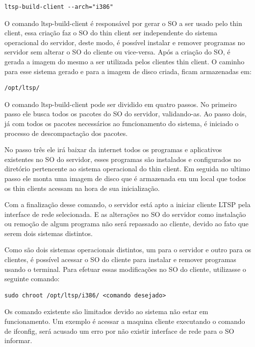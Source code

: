\documentclass[
	12pt,				%
	openright,			%
	twoside,			%
	a4paper,			%
	chapter=TITLE,		%
	english,			%
	brazil				%
	]{abntex2}
\begin{document}
\begin{verbatim}
ltsp-build-client --arch="i386" 
\end{verbatim}

O comando ltsp-build-client é responsável por gerar o SO a ser usado pelo thin client, essa criação faz o SO do thin client ser independente do sistema operacional do servidor, deste modo, é possível instalar e remover programas no servidor sem alterar o SO do cliente ou vice-versa. Após a criação do SO, é gerada a imagem do mesmo a ser utilizada pelos clientes thin client. O caminho para esse sistema gerado e para a imagem de disco criada, ficam armazenadas em:

\begin{verbatim}
/opt/ltsp/
\end{verbatim}

O comando ltsp-build-client pode ser dividido em quatro passos. No primeiro passo ele busca todos os pacotes do SO do servidor, validando-as. Ao passo dois, já com todos os pacotes necessários ao funcionamento do sistema, é iniciado o processo de descompactação dos pacotes. 

No passo três ele irá baixar da internet todos os programas e aplicativos existentes no SO do servidor,  esses programas são instalados e configurados no diretório pertencente ao sistema operacional do thin client.  Em seguida no ultimo passo ele monta uma imagem de disco que é armazenada em um local que todos os thin clients acessam na hora de sua inicialização.

Com a finalização desse comando, o servidor está apto a iniciar cliente LTSP pela interface de rede selecionada. E as alterações no SO do servidor como instalação ou remoção de algum programa não será repassado ao cliente, devido ao fato que serem dois sistemas distintos.

Como são dois sistemas operacionais distintos, um para o servidor e outro para os clientes, é possível acessar o SO do cliente para instalar e remover programas usando o terminal. Para efetuar essas modificações no SO do cliente, utilizasse o seguinte comando:

\begin{verbatim}
sudo chroot /opt/ltsp/i386/ <comando desejado>
\end{verbatim}

Os comando existente são limitados devido ao sistema não estar em funcionamento. Um exemplo é acessar a maquina cliente executando o comando de ifconfig, será acusado um erro por não existir interface de rede para o SO informar.
\end{document}
